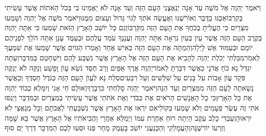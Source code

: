 \documentclass[../main/main.tex]{subfiles}
\begin{document}
\begin{multicols*}{\ncols}
וַיֹּאמֶר יַהְוֶה אֶל מֹשֶׁה עַד אָנָה יְנַאֲצֻנִי הָעָם הַזֶּה וְעַד אָנָה לֹא יַאֲמִינוּ בִי בְּכֹל הָאֹתוֹת אֲשֶׁר עָשִׂיתִי בְּקִרְבּוֹ\PreVerseSpace{}אַכֶּנּוּ בַדֶּבֶר וְאוֹרִשֶׁנּוּ וְאֶעֱשֶׂה אֹתְךָ לְגוֹי גָּדוֹל וְעָצוּם מִמֶּנּוּ\PreVerseSpace{}וַיֹּאמֶר מֹשֶׁה אֶל יַהְוֶה וְשָׁמְעוּ מִצְרַיִם כִּי הֶעֱלִיתָ בְכֹחֲךָ אֶת הָעָם הַזֶּה מִקִּרְבּוֹ\PreVerseSpace{}וְגַם כָּל\SubEnd{} יוֹשֵׁב הָאָרֶץ הַזֹּאת שָׁמְעוּ כִּי אַתָּה יַהְוֶה בְּקֶרֶב הָעָם הַזֶּה אֲשֶׁר עַיִן בְּעַיִן נִרְאָה אַתָּה יַהְוֶה וַעֲנָנְךָ עֹמֵד עֲלֵהֶם וּבְעַמֻּד עָנָן אַתָּה הֹלֵךְ לִפְנֵיהֶם יוֹמָם וּבְעַמּוּד אֵשׁ לָיְלָה\PreVerseSpace{}וְהֵמַתָּה אֶת הָעָם הַזֶּה כְּאִישׁ אֶחָד וְאָמְרוּ הַגּוֹיִם אֲשֶׁר שָׁמְעוּ אֶת שִׁמְעֲךָ לֵאמֹר\PreVerseSpace{}מִבִּלְתִּי יְכֹלֶת יַהְוֶה לְהָבִיא אֶת הָעָם הַזֶּה אֶל הָאָרֶץ אֲשֶׁר נִשְׁבַּע לָהֶם וַיִּשְׁחָטֵם בַּמִּדְבָּר\PreVerseSpace{}וְעַתָּה יִגְדַּל נָא כֹּחַ אֲדֹנָי כַּאֲשֶׁר דִּבַּרְתָּ לֵאמֹר\PreVerseSpace{}יַהְוֶה אֶרֶךְ אַפַּיִם וְרַב חֶסֶד נֹשֵׂא עָוֺן וָפָשַׁע וְנַקֵּה לֹא יְנַקֶּה פֹּקֵד עֲוֺן אָבוֹת עַל בָּנִים עַל שִׁלֵּשִׁים וְעַל רִבֵּעִים\PreVerseSpace{}סְלַח נָא לַעֲוֺן הָעָם הַזֶּה כְּגֹדֶל חַסְדֶּךָ וְכַאֲשֶׁר נָשָׂאתָה לָעָם הַזֶּה מִמִּצְרַיִם וְעַד הֵנָּה\PreVerseSpace{}וַיֹּאמֶר יַהְוֶה סָלַחְתִּי כִּדְבָרֶךָ\PreVerseSpace{}וְאוּלָם חַי אָנִי וְיִמָּלֵא כְבוֹד יַהְוֶה אֶת כָּל הָאָרֶץ\PreVerseSpace{}כִּי כָל הָאֲנָשִׁים הָרֹאִים אֶת כְּבֹדִי וְאֶת אֹתֹתַי אֲשֶׁר עָשִׂיתִי בְמִצְרַיִם וּבַמִּדְבָּר וַיְנַסּוּ אֹתִי זֶה עֶשֶׂר פְּעָמִים וְלֹא שָׁמְעוּ בְּקוֹלִי\PreVerseSpace{}אִם יִרְאוּ אֶת הָאָרֶץ אֲשֶׁר נִשְׁבַּעְתִּי לַאֲבֹתָם וְכָל מְנַאֲצַי לֹא יִרְאוּהָ\PreVerseSpace{}וְעַבְדִּי כָלֵב עֵקֶב הָיְתָה רוּחַ אַחֶרֶת עִמּוֹ וַיְמַלֵּא אַחֲרָי וַהֲבִיאֹתִיו אֶל הָאָרֶץ אֲשֶׁר בָּא שָׁמָּה וְזַרְעוֹ יוֹרִשֶׁנָּה\PreVerseSpace{}וְהָעֲמָלֵקִי וְהַכְּנַעֲנִי יוֹשֵׁב בָּעֵמֶק מָחָר פְּנוּ וּסְעוּ לָכֶם הַמִּדְבָּר דֶּרֶךְ יַם סוּף\OpenSection{}\par

\end{multicols*}
\end{document}
